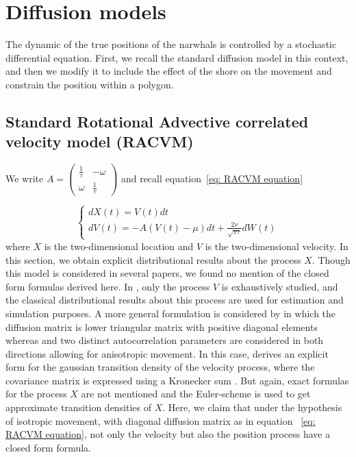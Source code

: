 \documentclass[11pt]{article}
\newcommand {\1}{\mathbb{1}}
\theoremstyle{definition}
\theoremstyle{remark}
\theoremstyle{remark}
\begin{document}
\section{Diffusion models}

The dynamic of the true positions of the narwhals is controlled by a stochastic differential equation. First, we recall the standard diffusion model in this context, and then we modify it to include the effect of the shore on the movement and constrain the position within a polygon.


\subsection{Standard Rotational Advective correlated velocity model (RACVM)}
\label{section: RACVM}


We write $A=\begin{pmatrix} 
	\frac{1}{\tau} & -\omega \\
	\omega & \frac{1}{\tau}
\end{pmatrix}$ and recall equation~\ref{eq: RACVM equation}

\begin{equation*} \left\{
	\begin{array}{l}
		dX(t)=V(t)dt \\
		dV(t)=-A(V(t)-\mu)dt+\frac{2\nu}{\sqrt{\pi \tau}} dW(t) 
	\end{array}
	\right.
	\label{eq: RACVM equation bis}
\end{equation*}
where $X$ is the two-dimensional location and $V$ is the two-dimensional velocity.
In this section, we obtain explicit distributional results about the process $X$. Though this model is considered in several papers, we found no mention of the closed form formulas derived here. In \cite{gurarie_correlated_2017}, only the process $V$ is exhaustively studied, and the classical distributional results about this process are used for estimation and simulation purposes.
A more general formulation is considered by \cite{albertsen_generalizing_2018} in which the diffusion matrix is lower triangular matrix with positive diagonal elements whereas and two distinct autocorrelation parameters are considered in both directions allowing for anisotropic movement.
In this case, \cite{albertsen_generalizing_2018} derives an explicit form for the gaussian transition density of the velocity process, where the covariance matrix is expressed using a Kronecker sum \cite{albertsen_generalizing_2018}. But again, exact formulas for the process $X$ are not mentioned and the Euler-scheme is used to get approximate transition densities of $X$. Here, we claim that under the hypothesis of isotropic movement, with diagonal diffusion matrix as in equation ~\ref{eq: RACVM equation}, not only the velocity but also the position process have a closed form formula. \\
\end{document}
